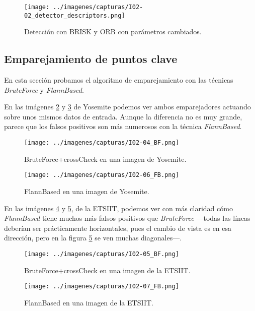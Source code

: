 \documentclass[a4paper, 11pt]{article}
\theoremstyle{definition}
\theoremstyle{theorem}
\begin{document}
    \begin{figure}[ht!]
        \centering
        \texttt{[image: ../imagenes/capturas/I02-02\_detector\_descriptors.png]}
        \caption{Detección con BRISK y ORB con parámetros cambiados. \label{descriptores_tuned}}
    \end{figure}

    \subsection{Emparejamiento de puntos clave}

    En esta sección probamos el algoritmo de emparejamiento con las técnicas \emph{BruteForce} y \emph{FlannBased}.

    En las imágenes \ref{bruteForce1} y \ref{flannBased1} de Yosemite podemos ver ambos emparejadores actuando sobre unos mismos datos de entrada. Aunque la diferencia no es muy grande, parece que los falsos positivos son más numerosos con la técnica \emph{FlannBased}.

    \begin{figure}[ht!]
        \centering
        \texttt{[image: ../imagenes/capturas/I02-04\_BF.png]}
        \caption{BruteForce+crossCheck en una imagen de Yosemite. \label{bruteForce1}}
    \end{figure}

    \begin{figure}[ht!]
        \centering
        \texttt{[image: ../imagenes/capturas/I02-06\_FB.png]}
        \caption{FlannBased en una imagen de Yosemite. \label{flannBased1}}
    \end{figure}

    En las imágenes \ref{bruteForce2} y \ref{flannBased2}, de la ETSIIT, podemos ver con más claridad cómo \emph{FlannBased} tiene muchos más falsos positivos que \emph{BruteForce} ---todas las líneas deberían ser prácticamente horizontales, pues el cambio de vista es en esa dirección, pero en la figura \ref{flannBased2} se ven muchas diagonales---.

    \begin{figure}[ht!]
        \centering
        \texttt{[image: ../imagenes/capturas/I02-05\_BF.png]}
        \caption{BruteForce+crossCheck en una imagen de la ETSIIT. \label{bruteForce2}}
    \end{figure}

    \begin{figure}[ht!]
        \centering
        \texttt{[image: ../imagenes/capturas/I02-07\_FB.png]}
        \caption{FlannBased en una imagen de la ETSIIT. \label{flannBased2}}
    \end{figure}
\end{document}

